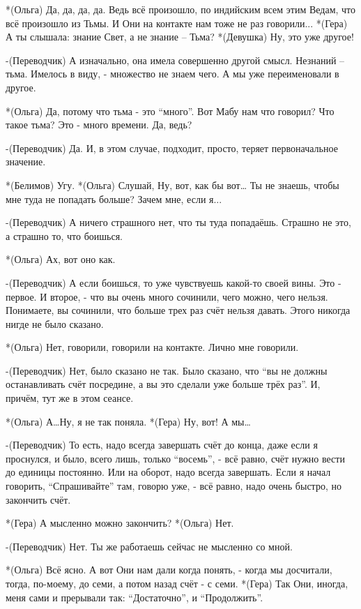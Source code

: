 *(Ольга) Да, да, да, да. Ведь всё произошло, по индийским всем этим Ведам, что всё произошло из Тьмы. И Они на контакте нам тоже не раз говорили...
*(Гера) А ты слышала: знание Свет, а не знание – Тьма?
*(Девушка) Ну, это уже другое!

-(Переводчик) А изначально, она имела совершенно другой смысл. Незнаний – тьма. Имелось в виду, - множество не знаем чего. А мы уже переименовали в другое. 

*(Ольга) Да, потому что тьма - это “много”. Вот Мабу нам что говорил? Что такое тьма? Это - много времени. Да, ведь? 

-(Переводчик) Да. И, в этом случае, подходит, просто, теряет первоначальное значение.

*(Белимов) Угу.
*(Ольга) Слушай, Ну, вот, как бы вот… Ты не знаешь, чтобы мне туда не попадать больше? Зачем мне, если я...

-(Переводчик) А ничего страшного нет, что ты туда попадаёшь. Страшно не это, а страшно то, что боишься. 

*(Ольга) Ах, вот оно как.

-(Переводчик) А если боишься, то уже чувствуешь какой-то своей вины. Это - первое. И второе, - что вы очень много сочинили, чего можно, чего нельзя. Понимаете, вы сочинили, что больше трех раз счёт нельзя давать. Этого никогда нигде не было сказано. 

*(Ольга) Нет, говорили, говорили на контакте. Лично мне говорили.

-(Переводчик) Нет, было сказано не так. Было сказано, что “вы не должны останавливать счёт посредине, а вы это сделали уже больше трёх раз”. И, причём, тут же в этом сеансе.  

*(Ольга) А…Ну, я не так поняла.
*(Гера) Ну, вот! А мы…

-(Переводчик) То есть, надо всегда завершать счёт до конца, даже если я проснулся, и было, всего лишь, только “восемь”, - всё равно, счёт нужно вести до единицы постоянно. Или на оборот, надо всегда завершать. Если я начал говорить, “Спрашивайте” там, говорю уже, - всё равно, надо очень быстро, но закончить счёт. 

*(Гера) А мысленно можно закончить?
*(Ольга) Нет.

-(Переводчик) Нет. Ты же работаешь сейчас не мысленно со мной.

*(Ольга) Всё ясно. А вот Они нам дали когда понять, - когда мы досчитали, тогда, по-моему, до семи, а потом назад счёт - с семи.
*(Гера) Так Они, иногда, меня сами и прерывали так: “Достаточно”, и “Продолжить”.

